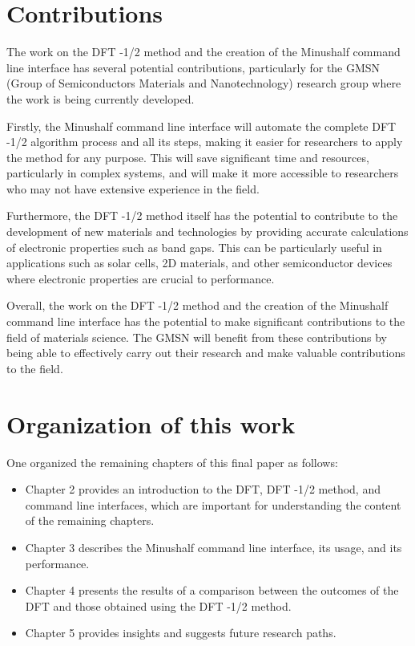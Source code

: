 \section{Contributions}
The work on the DFT -1/2 method and the creation of the Minushalf command line interface has several potential contributions, particularly for the GMSN (Group of Semiconductors Materials and Nanotechnology) research group where the work is being currently developed.

\medskip

Firstly, the Minushalf command line interface will automate the complete DFT -1/2 algorithm process and all its steps, making it easier for researchers to apply the method for any purpose. This will save significant time and resources, particularly in complex systems, and will make it more accessible to researchers who may not have extensive experience in the field.

\medskip

Furthermore, the DFT -1/2 method itself has the potential to contribute to the development of new materials and technologies by providing accurate calculations of electronic properties such as band gaps. This can be particularly useful in applications such as solar cells, 2D materials, and other semiconductor devices where electronic properties are crucial to performance.

\medskip

Overall, the work on the DFT -1/2 method and the creation of the Minushalf command line interface has the potential to make significant contributions to the field of materials science. The GMSN will benefit from these contributions by being able to effectively carry out their research and make valuable contributions to the field.
\section{Organization of this work}

One organized the remaining chapters of this final paper as follows:

\begin{itemize}
    \item Chapter 2 provides an introduction to the DFT, DFT -1/2 method, and command line interfaces, which are important for understanding the content of the remaining chapters. 
    \item Chapter 3 describes the Minushalf command line interface, its usage, and its performance.
    \item Chapter 4 presents the results of a comparison between the outcomes of the DFT and those obtained using the DFT -1/2 method.
    \item Chapter 5 provides insights and suggests future research paths.
\end{itemize}
